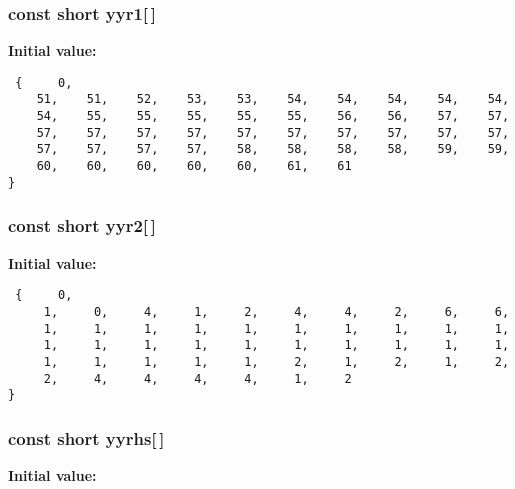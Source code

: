 \subsubsection{\setlength{\rightskip}{0pt plus 5cm}const short yyr1[$\,$]\hspace{0.3cm}{\tt  [static]}}\label{vcd__parser_8c_a88}


{\bf Initial value:}

\footnotesize\begin{verbatim} {     0,
    51,    51,    52,    53,    53,    54,    54,    54,    54,    54,
    54,    55,    55,    55,    55,    55,    56,    56,    57,    57,
    57,    57,    57,    57,    57,    57,    57,    57,    57,    57,
    57,    57,    57,    57,    58,    58,    58,    58,    59,    59,
    60,    60,    60,    60,    60,    61,    61
}\end{verbatim}\normalsize 
{}
\subsubsection{\setlength{\rightskip}{0pt plus 5cm}const short yyr2[$\,$]\hspace{0.3cm}{\tt  [static]}}\label{vcd__parser_8c_a89}


{\bf Initial value:}

\footnotesize\begin{verbatim} {     0,
     1,     0,     4,     1,     2,     4,     4,     2,     6,     6,
     1,     1,     1,     1,     1,     1,     1,     1,     1,     1,
     1,     1,     1,     1,     1,     1,     1,     1,     1,     1,
     1,     1,     1,     1,     1,     2,     1,     2,     1,     2,
     2,     4,     4,     4,     4,     1,     2
}\end{verbatim}\normalsize 
{}
\subsubsection{\setlength{\rightskip}{0pt plus 5cm}const short yyrhs[$\,$]\hspace{0.3cm}{\tt  [static]}}\label{vcd__parser_8c_a85}


{\bf Initial value:}


